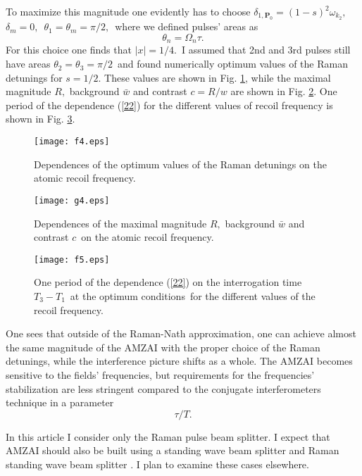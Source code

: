 \documentclass[twocolumn,showpacs,preprintnumbers]{revtex4}
\begin{document}
To maximize this magnitude one evidently has to choose $\delta _{1,\mathbf{P}%
_{0}}=\left( 1-s\right) ^{2}\omega _{k_{2}},$\ $\delta _{m}=0,$\ $\theta
_{1}=\theta _{m}=\pi /2,$\ where we defined pulses' areas as%
\begin{equation}
\theta _{n}=\Omega _{n}\tau .  \label{24}
\end{equation}%
For this choice one finds that $\left\vert x\right\vert =1/4.$\ I assumed
that 2nd and 3rd pulses still have areas $\theta _{2}=\theta _{3}=\pi /2$\
and found numerically optimum values of the Raman detunings for $s=1/2$.
These values are shown in Fig. \ref{f4}, while the maximal magnitude $R,$
background $\bar{w}$ and contrast $c=R/w$ are shown in Fig. \ref{g4}. One
period of the dependence (\ref{22}) for the different values of recoil
frequency is shown in Fig. \ref{f5}.

\begin{figure}[!t]
\texttt{[image: f4.eps]}
\caption{Dependences of the optimum values of the Raman detunings on the
atomic recoil frequency.}
\label{f4}
\end{figure}

\begin{figure}[!t]
\texttt{[image: g4.eps]}
\caption{Dependences of the maximal magnitude $R,$ background $\bar{w}$ and
contrast $c$\ on the atomic recoil frequency.}
\label{g4}
\end{figure}

\begin{figure}[!t]
\texttt{[image: f5.eps]}
\caption{One period of the dependence (\protect\ref{22}) on the
interrogation time $T_{3}-T_{1}$\ at the optimum conditions\ for the
different values of the recoil frequency.}
\label{f5}
\end{figure}

One sees that outside of the Raman-Nath approximation, one can achieve
almost the same magnitude of the AMZAI with the proper choice of the Raman
detunings, while the interference picture shifts as a whole. The AMZAI
becomes sensitive to the fields' frequencies, but requirements for the
frequencies' stabilization are less stringent compared to the conjugate
interferometers technique \cite{c14,c3.1} in a parameter 
\begin{equation}
\tau /T.  \label{25}
\end{equation}

In this article I consider only the Raman pulse beam splitter. I expect that
AMZAI should also be built using a standing wave beam splitter \cite{c1} and
Raman standing wave beam splitter \cite{c12}. I plan to examine these cases
elsewhere.
\end{document}
